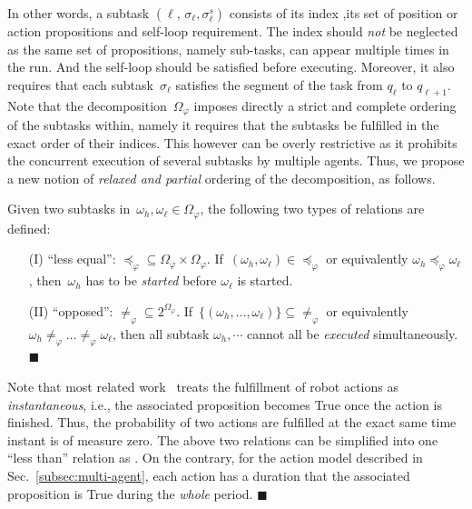 In other words, a subtask $(\ell,\,\sigma_\ell,\sigma^s_\ell)$ consists of its index
,its set of position or action propositions and self-loop requirement.
The index should \emph{not} be neglected as the same set of propositions, namely sub-tasks,
can appear multiple times in the run. And the self-loop should be satisfied 
before executing.
Moreover, it also requires that
each subtask~$\sigma_\ell$ satisfies the segment of the task from $q_\ell$ to $q_{\ell+1}$.
Note that the decomposition~$\Omega_{\varphi}$ imposes directly a {strict and complete} ordering of the subtasks within,
namely it requires that the subtasks be fulfilled in the exact order of their indices.
This however can be overly restrictive as it prohibits the concurrent execution of several subtasks by multiple agents.
Thus, we propose a new notion of \emph{relaxed and partial} ordering of the decomposition,
as follows.

\begin{definition}\label{def:partial}
Given two subtasks in~$\omega_h,
\omega_\ell\in \Omega_{\varphi}$,
the following two types of relations are defined:
\begin{itemize}
\item[(I)] ``less equal'': $\preceq_{\varphi}\subseteq \Omega_{\varphi} \times \Omega_{\varphi}$.
If~$(\omega_h, \omega_\ell)\in \preceq_{\varphi}$ or
equivalently $\omega_h\preceq_{\varphi}\omega_\ell$,
then~$\omega_h$ has to be \emph{started} before $\omega_\ell$ is started.
\item[(II)] ``opposed'': $\neq_{\varphi}\subseteq 2^{\Omega_{\varphi}}$.
If~$\{(\omega_h,\dots,\omega_\ell)\}\subseteq \neq_{\varphi}$
or equivalently $\omega_h\neq_{\varphi}\dots\neq_{\varphi}\omega_\ell$,
then all subtask $\omega_h,\cdots$ cannot all be \emph{executed} simultaneously. 
\hfill $\blacksquare$
\end{itemize}
\end{definition}

\begin{remark}\label{remark:duration}
Note that most related work~\cite{kantaros2020stylus, guo2015multi,
tumova2016multi, luo2021abstraction,luo2021temporal, sahin2019multirobot, jones2019scratchs}
treats the fulfillment of robot actions as \emph{instantaneous},
i.e., the associated proposition becomes True once the action is finished.
Thus, the probability of two actions are fulfilled at the exact same time instant is of measure zero.
The above two relations can be simplified into one ``less than'' relation as \cite{luo2021temporal}. 
On the contrary, for the action model described in Sec.~\ref{subsec:multi-agent},
each action has a duration that the associated proposition is True during the \emph{whole} period.
\hfill  $\blacksquare$
\end{remark}


